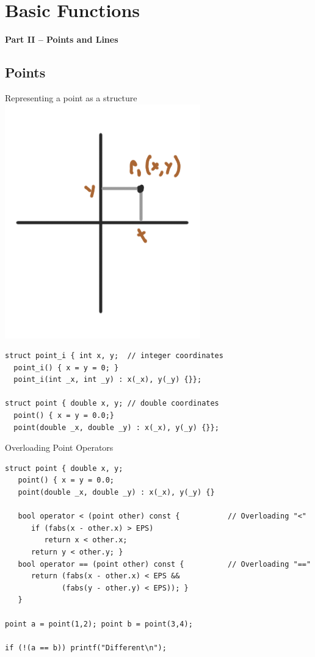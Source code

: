 

\section{Basic Functions}
\begin{frame}
  \centering
  {\bf Part II -- Points and Lines}
\end{frame}

\subsection{Points}
\begin{frame}[fragile]{Representing a point as a structure}
    \includegraphics[width=.15\textwidth]{../img/geom2}
    \begin{exampleblock}{}
\begin{verbatim}
struct point_i { int x, y;  // integer coordinates
  point_i() { x = y = 0; }
  point_i(int _x, int _y) : x(_x), y(_y) {}};

struct point { double x, y; // double coordinates
  point() { x = y = 0.0;}
  point(double _x, double _y) : x(_x), y(_y) {}};
\end{verbatim}
    \end{exampleblock}
\end{frame}

\begin{frame}[fragile]{Overloading Point Operators}

    \begin{exampleblock}{}
      {\smaller
\begin{verbatim}
struct point { double x, y;
   point() { x = y = 0.0;
   point(double _x, double _y) : x(_x), y(_y) {}

   bool operator < (point other) const {           // Overloading "<"
      if (fabs(x - other.x) > EPS)
         return x < other.x;
      return y < other.y; }
   bool operator == (point other) const {          // Overloading "=="
      return (fabs(x - other.x) < EPS &&
             (fabs(y - other.y) < EPS)); }
   }

point a = point(1,2); point b = point(3,4);

if (!(a == b)) printf("Different\n");
\end{verbatim}}
    \end{exampleblock}
\end{frame}

